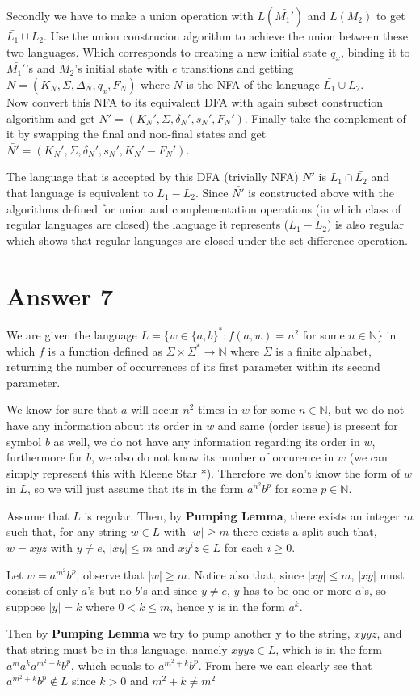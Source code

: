 \documentclass[12pt]{article}
\begin{document}
Secondly we have to make a union operation with $L(\bar{M_1'})$ and $L(M_2)$ to get $\bar{L_1} \cup L_2$. Use the union construcion algorithm to achieve the union between these two languages. Which corresponds to creating a new initial state $q_x$, binding it to $\bar{M_1'}$'s and $M_2$'s initial state with $e$ transitions and getting $N=(K_N,\Sigma,\Delta_N,q_x,F_N)$ where $N$ is the NFA of the language $\bar{L_1} \cup L_2$.\\

Now convert this NFA to its equivalent DFA with again subset construction algorithm and get $N'=(K_N',\Sigma,\delta_N',s_N',F_N')$. Finally take the complement of it by swapping the final and non-final states and get $\bar{N'}=(K_N',\Sigma,\delta_N',s_N',K_N'-F_N')$.

The language that is accepted by this DFA (trivially NFA) $\bar{N'}$ is $L_1 \cap \bar{L_2}$ and that language is equivalent to $L_1-L_2$. Since $\bar{N'}$ is constructed above with the algorithms defined for union and complementation operations (in which class of regular languages are closed) the language it represents ($L_1-L_2$) is also regular which shows that regular languages are closed under the set difference operation.


\section*{Answer 7}

We are given the language $L = \{w \in \{a,b\}^* : f(a,w) = n^2$ for some $n \in \mathbb{N}\}$ in which $f$ is a function defined as $\Sigma \times \Sigma^* \rightarrow \mathbb{N}$ where $\Sigma$ is a finite alphabet, returning the number of occurrences of its first parameter within its second parameter. 

We know for sure that $a$ will occur $n^2$ times in $w$ for some $n \in \mathbb{N}$, but we do not have any information about its order in $w$ and same (order issue) is present for symbol $b$ as well, we do not have any information regarding its order in $w$, furthermore for $b$, we also do not know its number of occurence in $w$ (we can simply represent this with Kleene Star *). Therefore we don't know the form of $w$ in $L$, so we will just assume that its in the form $a^{n^2}b^p$ for some $p \in \mathbb{N}$.

Assume that $L$ is regular. Then, by \textbf{Pumping Lemma}, there exists an integer $m$ such that, for any string $w \in L$ with $|w|\geq m$ there exists a split such that, $w = xyz$ with $y\neq e$, $|xy|\leq m$ and $xy^iz \in L$ for each $i\geq 0$.

Let $w=a^{m^2}b^p$, observe that $|w|\geq m$. Notice also that, since $|xy|\leq m$, $|xy|$ must consist of only $a$'s but no $b$'s and since $y\neq e$, $y$ has to be one or more $a$'s, so suppose $|y|=k$ where $0<k\leq m$, hence y is in the form $a^k$.

Then by \textbf{Pumping Lemma} we try to pump another y to the string, $xyyz$, and that string must be in this language, namely $xyyz \in L$, which is in the form $a^ma^ka^{m^2-k}b^p$, which equals to $a^{m^2+k}b^p$. From here we can clearly see that $a^{m^2+k}b^p \notin L$ since $k>0$ and $m^2+k \neq m^2$
\end{document}
